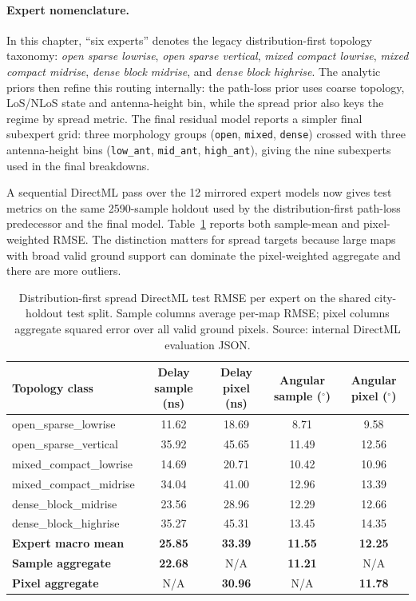 \paragraph{Expert nomenclature.}
In this chapter, ``six experts'' denotes the legacy distribution-first
topology taxonomy:
\emph{open sparse lowrise}, \emph{open sparse vertical},
\emph{mixed compact lowrise}, \emph{mixed compact midrise},
\emph{dense block midrise}, and \emph{dense block highrise}.
The analytic priors then refine this routing internally: the path-loss prior uses
coarse topology, LoS/NLoS state and antenna-height bin, while the spread prior
also keys the regime by spread metric. The final residual model reports a simpler final
subexpert grid: three morphology groups (\texttt{open}, \texttt{mixed},
\texttt{dense}) crossed with three antenna-height bins
(\texttt{low\_ant}, \texttt{mid\_ant}, \texttt{high\_ant}), giving the
nine subexperts used in the final breakdowns.

A sequential DirectML pass over the 12 mirrored expert models now gives
test metrics on the same 2590-sample holdout used by the distribution-first path-loss predecessor and the final model.
Table~\ref{tab:try77_per_expert} reports both sample-mean and
pixel-weighted RMSE. The distinction matters for spread targets because
large maps with broad valid ground support can dominate the pixel-weighted
aggregate and there are more outliers.

\begin{table}[H]
\centering
\caption[Distribution-first spread RMSE per expert.]%
{Distribution-first spread DirectML test RMSE per expert on the shared
city-holdout test split. Sample columns average per-map RMSE; pixel
columns aggregate squared error over all valid ground pixels. Source:
internal DirectML evaluation JSON.}
\label{tab:try77_per_expert}
\scriptsize
\begin{tabular}{lcccc}
\toprule
Topology class & Delay sample (ns) & Delay pixel (ns) & Angular sample ($^\circ$) & Angular pixel ($^\circ$) \\
\midrule
open\_sparse\_lowrise   & 11.62 & 18.69 &  8.71 &  9.58 \\
open\_sparse\_vertical  & 35.92 & 45.65 & 11.49 & 12.56 \\
mixed\_compact\_lowrise & 14.69 & 20.71 & 10.42 & 10.96 \\
mixed\_compact\_midrise & 34.04 & 41.00 & 12.96 & 13.39 \\
dense\_block\_midrise   & 23.56 & 28.96 & 12.29 & 12.66 \\
dense\_block\_highrise  & 35.27 & 45.31 & 13.45 & 14.35 \\
\midrule
\textbf{Expert macro mean} & \textbf{25.85} & \textbf{33.39} & \textbf{11.55} & \textbf{12.25} \\
\textbf{Sample aggregate}  & \textbf{22.68} & N/A & \textbf{11.21} & N/A \\
\textbf{Pixel aggregate}   & N/A & \textbf{30.96} & N/A & \textbf{11.78} \\
\bottomrule
\end{tabular}
\end{table}

